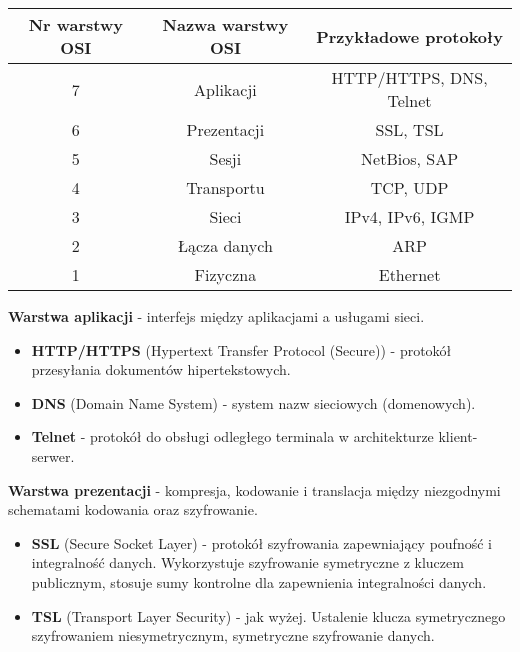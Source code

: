 \documentclass[main.tex]{subfiles}
\begin{document}
    \begin{table}[H]
        \begin{center}
            \begin{tabular}{|c|c|c| }
                \hline
                \textbf{Nr warstwy OSI} & \textbf{Nazwa warstwy OSI} & \textbf{Przykładowe protokoły}\\
                \hline
                \hline
                7 & Aplikacji & HTTP/HTTPS, DNS, Telnet\\
                \hline
                6 & Prezentacji & SSL, TSL\\
                \hline
                5 & Sesji & NetBios, SAP\\
                \hline
                4 & Transportu & TCP, UDP\\
                \hline
                3 & Sieci & IPv4, IPv6, IGMP\\
                \hline
                2 & Łącza danych & ARP\\
                \hline
                1 & Fizyczna & Ethernet\\
                \hline
            \end{tabular}
        \end{center}
    \end{table}

    \noindent \textbf{Warstwa aplikacji} - interfejs między aplikacjami a
    usługami sieci.
    \begin{itemize}[noitemsep]
        \item \textbf{HTTP/HTTPS} (Hypertext Transfer Protocol (Secure)) - protokół przesyłania dokumentów hipertekstowych.
        \item \textbf{DNS} (Domain Name System) - system nazw sieciowych (domenowych).
        \item \textbf{Telnet} - protokół do obsługi odległego terminala w architekturze klient-serwer.
    \end{itemize}

    \noindent \textbf{Warstwa prezentacji} - kompresja, kodowanie i
    translacja między niezgodnymi schematami kodowania oraz szyfrowanie.
    \begin{itemize}[noitemsep]
        \item \textbf{SSL} (Secure Socket Layer) - protokół szyfrowania zapewniający poufność i integralność danych.
        Wykorzystuje szyfrowanie symetryczne z kluczem publicznym, stosuje sumy kontrolne dla zapewnienia integralności danych.
        \item \textbf{TSL} (Transport Layer Security) - jak wyżej. Ustalenie klucza symetrycznego szyfrowaniem niesymetrycznym,
        symetryczne szyfrowanie danych.
    \end{itemize}
\end{document}
